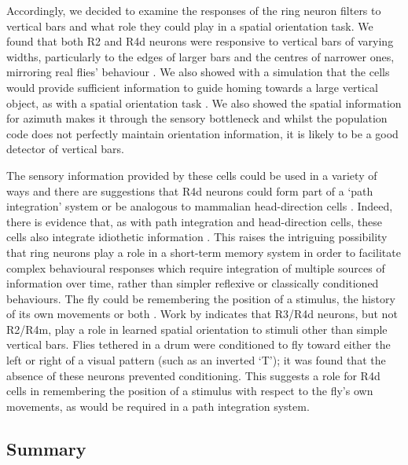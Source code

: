 \documentclass[10pt]{article}
\begin{document}
Accordingly, we decided to examine the responses of the ring neuron filters to vertical bars and what role they could play in a spatial orientation task.
We found that both R2 and R4d neurons were responsive to vertical bars of varying widths, particularly to the edges of larger bars and the centres of narrower ones, mirroring real flies' behaviour \cite{Osorio1990}.
We also showed with a simulation that the cells would provide sufficient information to guide homing towards a large vertical object, as with a spatial orientation task \cite{Neuser2008}.
We also showed the spatial information for azimuth makes it through the sensory bottleneck and whilst the population code does not perfectly maintain orientation information, it is likely to be a good detector of vertical bars.

The sensory information provided by these cells could be used in a variety of ways and there are suggestions that R4d neurons could form part of a `path integration' system \cite{Neuser2008} or be analogous to mammalian head-direction cells \cite{Tomchik2008}.
Indeed, there is evidence that, as with path integration and head-direction cells, these cells also integrate idiothetic information \cite{Zars2009}.
This raises the intriguing possibility that ring neurons play a role in a short-term memory system in order to facilitate complex behavioural responses which require integration of multiple sources of information over time, rather than simpler reflexive or classically conditioned behaviours. The fly could be remembering the position of a stimulus, the history of its own movements or both \cite{Tomchik2008}.
Work by \cite{Guo2015} indicates that R3/R4d neurons, but not R2/R4m, play a role in learned spatial orientation to stimuli other than simple vertical bars.
Flies tethered in a drum were conditioned to fly toward either the left or right of a visual pattern (such as an inverted `T'); it was found that the absence of these neurons prevented conditioning.
This suggests a role for R4d cells in remembering the position of a stimulus with respect to the fly's own movements, as would be required in a path integration system.

\subsection{Summary}
\end{document}
